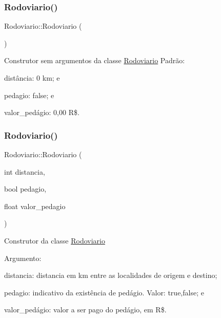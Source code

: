 \subsubsection{\texorpdfstring{Rodoviario()}{Rodoviario()}\hspace{0.1cm}{\footnotesize\ttfamily [1/2]}}
{\footnotesize\ttfamily Rodoviario\+::\+Rodoviario (\begin{DoxyParamCaption}{ }\end{DoxyParamCaption})}

Construtor sem argumentos da classe \hyperlink{classRodoviario}{Rodoviario} Padrão\+:
\begin{DoxyItemize}
\item distância\+: 0 km; e
\item pedagio\+: false; e
\item valor\+\_\+pedágio\+: 0,00 R\$.
\end{DoxyItemize}\mbox{\label{classRodoviario_a56cdc15643e5d023e2d4c61139ecc16d}} 
\subsubsection{\texorpdfstring{Rodoviario()}{Rodoviario()}\hspace{0.1cm}{\footnotesize\ttfamily [2/2]}}
{\footnotesize\ttfamily Rodoviario\+::\+Rodoviario (\begin{DoxyParamCaption}\item[{int}]{distancia,  }\item[{bool}]{pedagio,  }\item[{float}]{valor\+\_\+pedagio }\end{DoxyParamCaption})}

Construtor da classe \hyperlink{classRodoviario}{Rodoviario}

Argumento\+:
\begin{DoxyItemize}
\item distancia\+: distancia em km entre as localidades de origem e destino;
\item pedagio\+: indicativo da existência de pedágio. Valor\+: true,false; e
\item valor\+\_\+pedágio\+: valor a ser pago do pedágio, em R\$.
\end{DoxyItemize}\mbox{\label{classRodoviario_a11df25b437139f12013adc0d861b7970}} 
